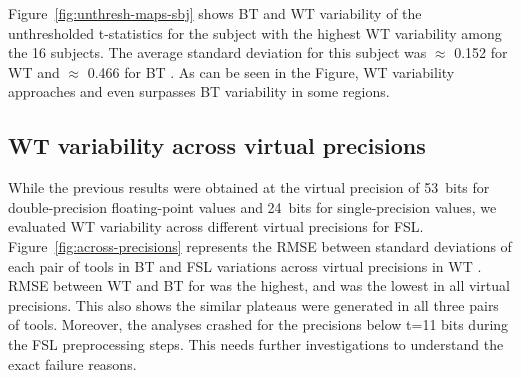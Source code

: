 \documentclass[conference]{IEEEtran}
\begin{document}
  Figure~\ref{fig:unthresh-maps-sbj} shows BT and WT variability of the
  unthresholded t-statistics for the subject with the highest WT
  variability among the 16 subjects. The average standard deviation for
  this subject was $\approx$ 0.152 for WT and $\approx$ 0.466 for BT
  .
  As can be seen in the Figure, WT variability approaches and even surpasses BT variability in some regions.
  

\begin{figure}[ht]
\end{figure}

\subsection{WT variability across virtual precisions}

While the previous results were obtained at the virtual precision of 53~bits for double-precision floating-point values
and 24~bits for single-precision values, we evaluated WT variability across different virtual precisions for FSL. 
Figure~\ref{fig:across-precisions} represents the RMSE between standard deviations of each pair of tools in BT and FSL variations across virtual precisions in WT .
RMSE between WT and BT for \fslafni was the highest, and \fslspm was the lowest in all virtual precisions.
This also shows the similar plateaus were generated in all three pairs of tools.
Moreover, the analyses crashed for the precisions below t=11 bits during the FSL preprocessing steps. 
This needs further investigations to understand the exact failure reasons. 
\end{document}
